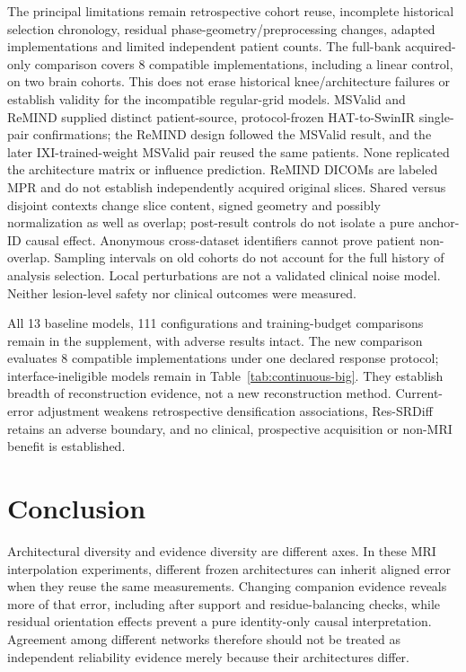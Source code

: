 \documentclass[10pt,twocolumn,letterpaper]{article}
\begin{document}
The principal limitations remain retrospective cohort reuse, incomplete historical selection chronology, residual phase-geometry/preprocessing changes, adapted implementations and limited independent patient counts. The full-bank acquired-only comparison covers 8 compatible implementations, including a linear control, on two brain cohorts. This does not erase historical knee/architecture failures or establish validity for the incompatible regular-grid models. MSValid and ReMIND supplied distinct patient-source, protocol-frozen HAT-to-SwinIR single-pair confirmations; the ReMIND design followed the MSValid result, and the later IXI-trained-weight MSValid pair reused the same patients. None replicated the architecture matrix or influence prediction. ReMIND DICOMs are labeled MPR and do not establish independently acquired original slices. Shared versus disjoint contexts change slice content, signed geometry and possibly normalization as well as overlap; post-result controls do not isolate a pure anchor-ID causal effect. Anonymous cross-dataset identifiers cannot prove patient non-overlap. Sampling intervals on old cohorts do not account for the full history of analysis selection. Local perturbations are not a validated clinical noise model. Neither lesion-level safety nor clinical outcomes were measured.

All 13 baseline models, 111 configurations and training-budget comparisons remain in the supplement, with adverse results intact. The new comparison evaluates 8 compatible implementations under one declared response protocol; interface-ineligible models remain in Table~\ref{tab:continuous-big}. They establish breadth of reconstruction evidence, not a new reconstruction method. Current-error adjustment weakens retrospective densification associations, Res-SRDiff retains an adverse boundary, and no clinical, prospective acquisition or non-MRI benefit is established.

\section{Conclusion}
Architectural diversity and evidence diversity are different axes. In these MRI interpolation experiments, different frozen architectures can inherit aligned error when they reuse the same measurements. Changing companion evidence reveals more of that error, including after support and residue-balancing checks, while residual orientation effects prevent a pure identity-only causal interpretation. Agreement among different networks therefore should not be treated as independent reliability evidence merely because their architectures differ.
\end{document}
